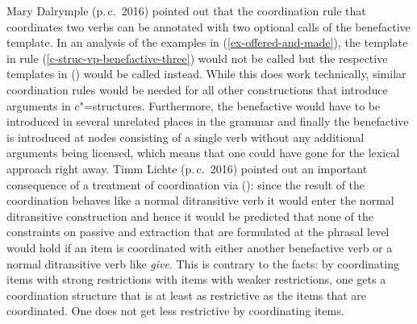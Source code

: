 Mary Dalrymple (p.\,c.\ 2016) pointed out that the coordination rule that coordinates two verbs can
be annotated with two optional calls of the benefactive template.
\ea
{}
\z
In an analysis of the examples in (\ref{ex-offered-and-made}), the template in rule
(\ref{c-struc-vp-benefactive-three}) would not be called but the respective templates in () would
be called instead. While this does work technically, similar coordination rules would be needed for all other
constructions that introduce arguments in c"=structures. Furthermore, the benefactive would have to
be introduced in several unrelated places in the grammar and finally the benefactive is introduced
at nodes consisting of a single verb without any additional arguments being licensed, which means
that one could have gone for the lexical approach right away. Timm Lichte (p.\,c.\ 2016) pointed out
an important consequence of a treatment of coordination via (): since the result of the
coordination behaves like a normal ditransitive verb it would enter the normal ditransitive
construction and hence it would be predicted that none of the constraints on passive and extraction
that are formulated at the phrasal level would hold if an item is coordinated with either another
benefactive verb or a normal ditransitive verb like \emph{give}. This is contrary to the facts: by
coordinating items with strong restrictions with items with weaker restrictions, one gets a
coordination structure that is at least as restrictive as the items that are coordinated. One does
not get less restrictive by coordinating items.

